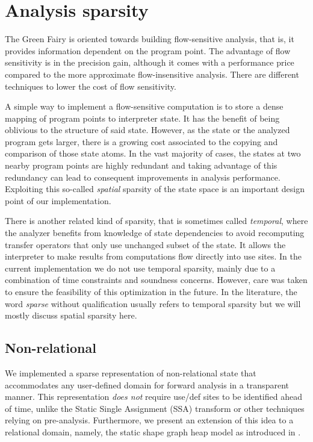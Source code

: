 \documentclass[11pt]{article}
\begin{document}
\section*{Analysis sparsity}

The Green Fairy is oriented towards building flow-sensitive analysis, that is, it provides information dependent on the program point.
The advantage of flow sensitivity is in the precision gain, although it comes with a performance price compared to the more approximate flow-insensitive analysis.
There are different techniques to lower the cost of flow sensitivity.

A simple way to implement a flow-sensitive computation is to store a dense mapping of program points to interpreter state. It has the benefit of being oblivious to the structure of said state.
However, as the state or the analyzed program gets larger, there is a growing cost associated to the copying and comparison of those state atoms.
In the vast majority of cases, the states at two nearby program points are highly redundant and taking advantage of this redundancy can lead to consequent improvements in analysis performance. Exploiting this so-called \emph{spatial} sparsity of the state space is an important design point of our implementation.

There is another related kind of sparsity, that is sometimes called \emph{temporal}, where the analyzer benefits from knowledge of state dependencies to avoid recomputing transfer operators that only use unchanged subset of the state. It allows the interpreter to make results from computations flow directly into use sites.
In the current implementation we do not use temporal sparsity, mainly due to a combination of time constraints and soundness concerns. However, care was taken to ensure the feasibility of this optimization in the future.
In the literature, the word \emph{sparse} without qualification usually refers to temporal sparsity but we will mostly discuss spatial sparsity here.

\subsection*{Non-relational}

We implemented a sparse representation of non-relational state that accommodates any user-defined domain for forward analysis in a transparent manner.
This representation \emph{does not} require use/def sites to be identified ahead of time, unlike the Static Single Assignment (SSA) transform or other techniques relying on pre-analysis\cite{sparse-nr}.
Furthermore, we present an extension of this idea to a relational domain, namely, the static shape graph heap model as introduced in \cite{ssc}.
\end{document}
